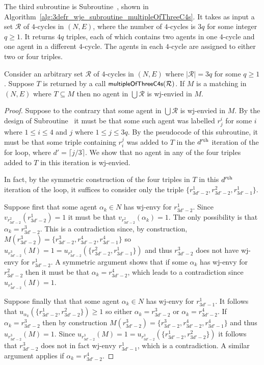 The third subroutine is Subroutine~, shown in Algorithm~\ref{alg:3defr_wje_subroutine_multipleOfThreeC4s}. It takes as input a set $\mathcal{R}$ of $4$-cycles in $(N, E)$, where the number of $4$-cycles is $3q$ for some integer $q \geq 1$. It returns $4q$ triples, each of which contains two agents in one $4$-cycle and one agent in a different $4$-cycle. The agents in each $4$-cycle are assigned to either two or four triples.



\begin{lem}
\label{lem:threed_efr_as_max_degree_2_subgraph_multipleOfThreeC4s}
Consider an arbitrary set $\mathcal{R}$ of $4$-cycles in $(N, E)$ where $|\mathcal{R}|=3q$ for some $q\geq 1$. Suppose $T$ is returned by a call $\algorithmfont{multipleOfThreeC4s}(\mathcal{R})$. If $M$ is a matching in $(N, E)$ where $T \subseteq M$ then no agent in $\bigcup \mathcal{R}$ is wj-envied in $M$.
\end{lem}
\begin{proof}
Suppose to the contrary that some agent in $\bigcup \mathcal{R}$ is wj-envied in $M$. By the design of Subroutine~ it must be that some such agent was labelled $r_j^i$ for some $i$ where $1\leq i \leq 4$ and $j$ where $1\leq j \leq 3q$. By the pseudocode of this subroutine, it must be that some triple containing $r_i^j$ was added to $T$ in the $d'\textsuperscript{th}$ iteration of the for loop, where $d' = \lceil j / 3 \rceil$. We show that no agent in any of the four triples added to $T$ in this iteration is wj-envied.

In fact, by the symmetric construction of the four triples in $T$ in this $d'\textsuperscript{th}$ iteration of the loop, it suffices to consider only the triple $\{ r_{3d'-2}^1, r_{3d'-2}^2, r_{3d'-1}^1 \}$. 

Suppose first that some agent $\alpha_k \in N$ has wj-envy for $r_{3d'-2}^1$. Since $v_{r_{3d'-2}^2}(r_{3d'-2}^1) = 1$ it must be that $v_{r_{3d'-2}^2}(\alpha_k) = 1$. The only possibility is that $\alpha_k = r_{3d'-2}^3$. This is a contradiction since, by construction, $M(r_{3d'-2}^3) = \{ r_{3d'-2}^3, r_{3d'-2}^4, r_{3d'-1}^4 \}$ so $u_{r_{3d'-2}^3}(M) = 1 = u_{r_{3d'-2}^3}(\{ r_{3d'-2}^2, r_{3d'-1}^1 \})$ and thus $r_{3d'-2}^3$ does not have wj-envy for $r_{3d'-2}^1$. A symmetric argument shows that if some $\alpha_k$ has wj-envy for $r_{3d'-2}^2$ then it must be that $\alpha_k = r_{3d'-2}^4$, which leads to a contradiction since $u_{r_{3d'-2}^4}(M)=1$.

Suppose finally that that some agent $\alpha_k \in N$ has wj-envy for $r_{3d'-1}^1$. It follows that $u_{\alpha_k}(\{ r_{3d'-2}^1, r_{3d'-2}^2 \}) \geq 1$ so either $\alpha_k = r_{3d'-2}^3$ or $\alpha_k = r_{3d'-2}^4$. If $\alpha_k = r_{3d'-2}^3$ then by construction $M(r_{3d'-2}^3) = \{ r_{3d'-2}^3, r_{3d'-2}^4, r_{3d'-1}^4 \}$ and thus $u_{r_{3d'-2}^3}(M) = 1$. Since $u_{r_{3d'-2}^3}(M) = 1 = u_{r_{3d'-2}^3}(\{ r_{3d'-2}^1, r_{3d'-2}^2 \})$ it follows that $r_{3d'-2}^3$ does not in fact wj-envy $r_{3d'-1}^1$, which is a contradiction. A similar argument applies if $\alpha_k = r_{3d'-2}^4$.
\end{proof}

